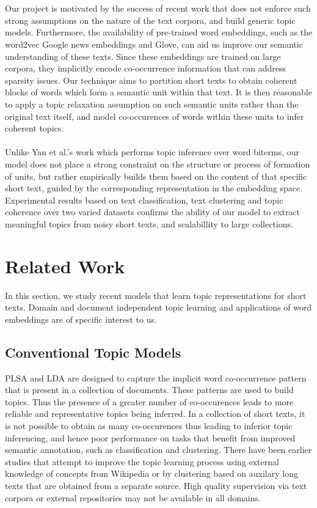 \documentclass{sig-alternate-05-2015}
\begin{document}
\\
\\
Our project is motivated by the success of recent work that does not enforce such strong assumptions on the nature of the text corpora, and build generic topic models. Furthermore, the availability of pre-trained word embeddings, such as the word2vec\cite{w2v} Google news embeddings and Glove\cite{glove}, can aid us improve our semantic understanding of these texts. Since these embeddings are trained on large corpora, they implicitly encode co-occurrence information that can address sparsity issues. Our technique aims to partition short texts to obtain coherent blocks of words which form a semantic unit within that text. It is then reasonable to apply a topic relaxation assumption on such semantic units rather than the original text itself, and model co-occurences of words within these units to infer coherent topics. 
\\
\\
Unlike Yan et al.'s work \cite{btm} which performs topic inference over word biterms, our model does not place a strong constraint on the structure or process of formation of units, but rather empirically builds them based on the content of that specific short text, guided by the corresponding representation in the embedding space. Experimental results based on text classification, text clustering and topic coherence over two varied datasets confirms the ability of our model to extract meaningful topics from noisy short texts, and scalabillity to large collections.

\section{Related Work}
In this section, we study recent models that learn topic representations for short texts. Domain and document independent topic learning and applications of word embeddings are of specific interest to us.
\subsection{Conventional Topic Models}
PLSA and LDA are designed to capture the implicit word co-occurrence pattern that is present in a collection of documents. These patterns are used to build topics. Thus the presence of a greater number of co-occurences leads to more reliable and representative topics being inferred. In a collection of short texts, it is not possible to obtain as many co-occurences thus leading to inferior topic inferencing, and hence poor performance on tasks that benefit from improved semantic annotation, such as classification and clustering. There have been earlier studies that attempt to improve the topic learning process using external knowledge of concepts from Wikipedia\cite{phan} or by clustering based on auxilary long texts that are obtained from a separate source\cite{jin}. High quality supervision via text corpora or external repositories may not be available in all domains.
\end{document}
